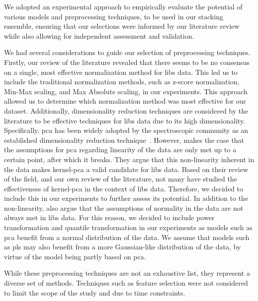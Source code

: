 We adopted an experimental approach to empirically evaluate the potential of various models and preprocessing techniques, to be used in our stacking ensemble, ensuring that our selections were informed by our literature review while also allowing for independent assessment and validation.

We had several considerations to guide our selection of preprocessing techniques.
Firstly, our review of the literature revealed that there seems to be no consensus on a single, most effective normalization method for \gls{libs} data.
This led us to include the traditional normalization methods, such as z-score normalization, Min-Max scaling, and Max Absolute scaling, in our experiments.
This approach allowed us to determine which normalization method was most effective for our dataset. 
Additionally, dimensionality reduction techniques are considered by the literature to be effective techniques for \gls{libs} data due to its high dimensionality. Specifically, \gls{pca} has been widely adopted by the spectroscopic community as an established dimensionality reduction technique~\cite{pca_review_paper}. However, \citet{pca_review_paper} makes the case that the assumptions for \gls{pca} regarding linearity of the data are only met up to a certain point, after which it breaks. They argue that this non-linearity inherent in the data makes \gls{kernel-pca} a valid candidate for \gls{libs} data. Based on their review of the field, and our own review of the literature, not many have studied the effectiveness of \gls{kernel-pca} in the context of \gls{libs} data. Therefore, we decided to include this in our experiments to further assess its potential. In addition to the non-linearity, \citet{pca_review_paper} also argue that the assumptions of normality in the data are not always met in \gls{libs} data. For this reason, we decided to include power transformation and quantile transformation in our experiments as models such as \gls{pca} benefit from a normal distribution of the data. We assume that models such as \gls{pls} may also benefit from a more Gaussian-like distribution of the data, by virtue of the model being partly based on \gls{pca}.

While these preprocessing techniques are not an exhaustive list, they represent a diverse set of methods.
Techniques such as feature selection were not considered to limit the scope of the study and due to time constraints.

